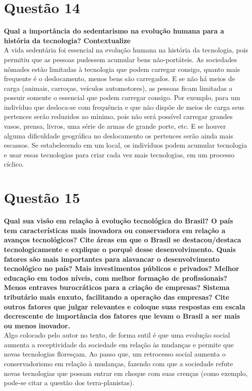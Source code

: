 
\section{Questão 14}
\label{sec:q14}
\textbf{Qual a importância do sedentarismo na evolução humana para a história da tecnologia? Contextualize} \\

A vida sedentária foi essencial na evolução humana na história da tecnologia, pois permitiu que as pessoas pudessem acumular bens não-portáteis. As sociedades nômades estão limitadas à tecnologia que podem carregar consigo, quanto mais frequente é o deslocamento, menos bens são carregados. E se não há meios de carga (animais, carroças, veículos automotores), as pessoas ficam limitadas a possuir somente o essencial que podem carregar consigo. Por exemplo, para um indivíduo que desloca-se com frequência e que não dispõe de meios de carga seus pertences serão reduzidos ao mínimo, pois não será possível carregar grandes vasos, prensa, livros, uma série de armas de grande porte, etc. E se houver alguma dificuldade geográfica no deslocamento os pertences serão ainda mais escassos. Se estabelecendo em um local, os indivíduos podem acumular tecnologia e usar essas tecnologias para criar cada vez mais tecnologias, em um processo cíclico. 


\section{Questão 15}
\label{sec:q15}
\textbf{Qual sua visão em relação à evolução tecnológica do Brasil? O país tem características mais inovadora ou conservadora em relação a avanços tecnológicos? Cite áreas em que o Brasil se destacou/destaca tecnologicamente e explique o porquê desse desenvolvimento. Quais fatores são mais importantes para alavancar o desenvolvimento tecnológico no país? Mais investimentos públicos e privados? Melhor educação em todos níveis, com melhor formação de profissionais? Menos entraves burocráticos para a criação de empresas? Sistema tributário mais enxuto, facilitando a operação das empresas? Cite outros fatores que julgar relevantes e coloque suas respostas em escala decrescente de importância dos fatores que levam o Brasil a ser mais ou menos inovador.} \\

Algo colocado pelo autor no texto, de forma sutil é que uma evolução social aumenta a receptividade da sociedade em relação às mudanças e permite que novas tecnologias floresçam. Ao passo que, um retrocesso social aumenta o conservadorismo em relação à mudanças, fazendo com que a sociedade refute novas tecnologias que possam entrar em choque com suas crenças (como exemplo, pode-se citar a questão dos terra-planistas). 

